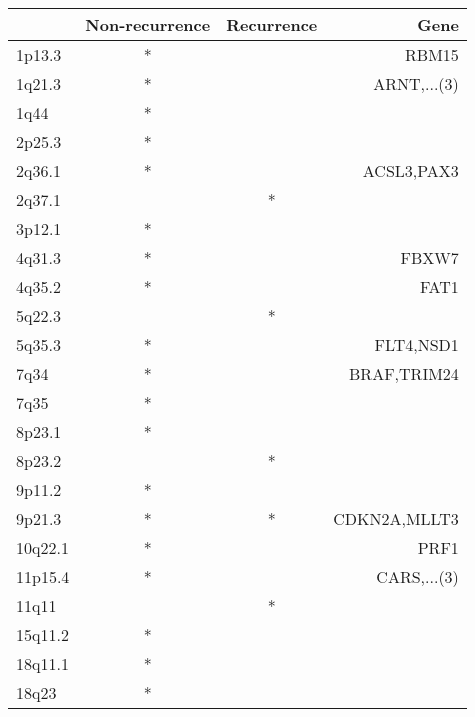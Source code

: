 \begin{tabular}{lccr}
\toprule
{} & Non-recurrence & Recurrence &          Gene \\
\midrule
1p13.3  &              * &            &         RBM15 \\
1q21.3  &              * &            &   ARNT,...(3) \\
1q44    &              * &            &               \\
2p25.3  &              * &            &               \\
2q36.1  &              * &            &    ACSL3,PAX3 \\
2q37.1  &                &          * &               \\
3p12.1  &              * &            &               \\
4q31.3  &              * &            &         FBXW7 \\
4q35.2  &              * &            &          FAT1 \\
5q22.3  &                &          * &               \\
5q35.3  &              * &            &     FLT4,NSD1 \\
7q34    &              * &            &   BRAF,TRIM24 \\
7q35    &              * &            &               \\
8p23.1  &              * &            &               \\
8p23.2  &                &          * &               \\
9p11.2  &              * &            &               \\
9p21.3  &              * &          * &  CDKN2A,MLLT3 \\
10q22.1 &              * &            &          PRF1 \\
11p15.4 &              * &            &   CARS,...(3) \\
11q11   &                &          * &               \\
15q11.2 &              * &            &               \\
18q11.1 &              * &            &               \\
18q23   &              * &            &               \\
\bottomrule
\end{tabular}
